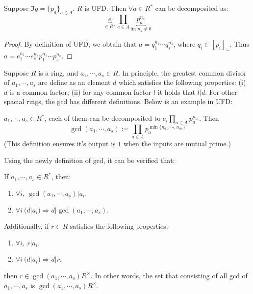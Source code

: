\begin{proposition}
    Suppose $\Im g = \{ p_a \}_{a \in A}$. $R$ is UFD. Then $\forall a \in R^*$ can be decomposited as:
    \[
        \underbracket{e}_{\in R^{\times}} \prod_{a \in A} \underbracket{p_a^{n_a}}_{\text{fm } n_a \neq 0 } 
    \]
\end{proposition}

\begin{proof}
    By definition of UFD, we obtain that $a = q_1^{n_1} \cdots q_s^{n_s}$, where $q_i \in [p_i]_{\sim}$. Thus $a = e_1^{n_1} \cdots e_s^{n_s} p_1^{n_1} \cdots p_s^{n_s}$.
\end{proof}



Suppose $R$ is a ring, and $a_1, \cdots, a_s \in R$. In principle, the greatest common divisor of $a_1, \cdots, a_s$ are define as an element $d$ which satisfies the following properties: (i) $d$ is a common factor; (ii) for any common factor $l$ it holds that $l | d$. For other spacial rings, the gcd has different definitions. Below is an example in UFD:



\begin{definition}
    $a_1 , \cdots, a_s \in R^*$, each of them can be decomposited to $e_i \prod_{a \in A} p_a^{n_{ai}}$. Then
    \[
        \gcd(a_1, \cdots, a_s) := \prod_{a \in A} p_a^{\min\{ n_{a1}, \cdots, n_{as} \}}
    \]
    (This definition ensures it's output is $1$ when the inputs are mutual prime.)
\end{definition}





Using the newly definition of gcd, it can be verified that:
\begin{proposition}
    If $a_1 , \cdots, a_s \in R^*$, then:
    \begin{enumerate}
        \item $\forall i,\ \gcd(a_1, \cdots, a_s) | a_i$.
        \item $\forall i \ (d | a_i) \Rightarrow d | \gcd(a_1, \cdots, a_s)$.
    \end{enumerate}
    Additionally, if $r \in R$ satisfies the following properties:
    \begin{enumerate}
        \item $\forall i,\ r | a_i$.
        \item $\forall i \ (d | a_i) \Rightarrow d | r$.
    \end{enumerate}
    then $r \in \gcd(a_1, \cdots, a_s) R^{\times}$. In other words, the set that consisting of all gcd of $a_1, \cdots, a_s$ is $\gcd(a_1, \cdots, a_s) R^{\times}$.
\end{proposition}





